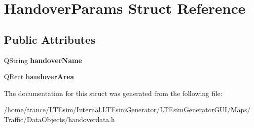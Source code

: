 \hypertarget{struct_handover_params}{}\section{Handover\+Params Struct Reference}
\label{struct_handover_params}
\subsection*{Public Attributes}
\begin{DoxyCompactItemize}
\item 
Q\+String {\bfseries handover\+Name}\hypertarget{struct_handover_params_aeffdfac83dad11bd194b0840aee85280}{}\label{struct_handover_params_aeffdfac83dad11bd194b0840aee85280}

\item 
Q\+Rect {\bfseries handover\+Area}\hypertarget{struct_handover_params_a3b6ca35a4d4eb3441766dd0cb8f2e13b}{}\label{struct_handover_params_a3b6ca35a4d4eb3441766dd0cb8f2e13b}

\end{DoxyCompactItemize}


The documentation for this struct was generated from the following file\+:\begin{DoxyCompactItemize}
\item 
/home/trance/\+L\+T\+Esim/\+Internal.\+L\+T\+Esim\+Generator/\+L\+T\+Esim\+Generator\+G\+U\+I/\+Maps/\+Traffic/\+Data\+Objects/handoverdata.\+h\end{DoxyCompactItemize}
